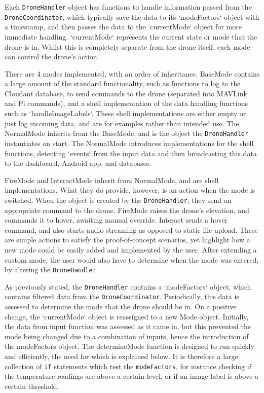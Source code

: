 \documentclass{article}
\begin{document}
Each \texttt{DroneHandler} object has functions to handle information passed from the \texttt{DroneCoordinator}, which typically save the data to its `modeFactors` object with a timestamp, and then passes the data to the `currentMode` object for more immediate handling. `currentMode` represents the current state or mode that the drone is in. Whilst this is completely separate from the drone itself, each mode can control the drone's action. 

There are 4 modes implemented, with an order of inheritance. BaseMode contains a large amount of the standard functionality, such as functions to log to the Cloudant database, to send commands to the drone (separated into MAVLink and Pi commands), and a shell implementation of the data handling functions such as `handleImageLabels`. These shell implementations are either empty or just log incoming data, and are for examples rather than intended use. The NormalMode inherits from the BaseMode, and is the object the \texttt{DroneHandler} instantiates on start. The NormalMode introduces implementations for the shell functions, detecting `events` from the input data and then broadcasting this data to the dashboard, Android app, and databases. 

FireMode and InteractMode inherit from NormalMode, and are shell implementations. What they do provide, however, is an action when the mode is switched. When the object is created by the \texttt{DroneHandler}, they send an appropriate command to the drone. FireMode raises the drone's elevation, and commands it to hover, awaiting manual override. Interact sends a hover command, and also starts audio streaming as opposed to static file upload. These are simple actions to satisfy the proof-of-concept scenarios, yet highlight how a new mode could be easily added and implemented by the user. After extending a custom mode, the user would also have to determine when the mode was entered, by altering the \texttt{DroneHandler}.

As previously stated, the \texttt{DroneHandler} contains a `modeFactors` object, which contains filtered data from the \texttt{DroneCoordinator}. Periodically, this data is assessed to determine the mode that the drone should be in. On a positive change, the `currentMode` object is reassigned to a new Mode object. Initially, the data from input function was assessed as it came in, but this prevented the mode being changed due to a combination of inputs, hence the introduction of the modeFactors object. The determineMode function is designed to run quickly and efficiently, the need for which is explained below. It is therefore a large collection of \texttt{if} statements which test the \texttt{modeFactors}, for instance checking if the temperature readings are above a certain level, or if an image label is above a certain threshold. 
\end{document}
